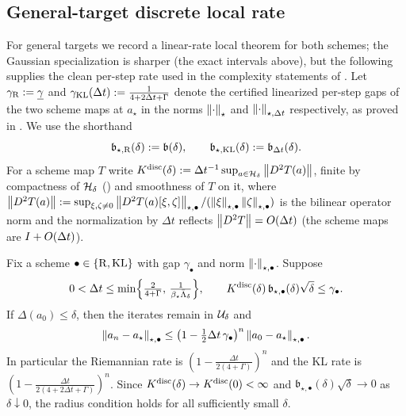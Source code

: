 \subsection{General-target discrete local rate}
\label{subsec:disc-general}

For general targets we record a linear-rate local theorem for both schemes; the Gaussian
specialization is sharper (the exact intervals above), but the following supplies the clean
per-step rate used in the complexity statements of . Let
$\gamma_{\mathrm{R}}:=\underline{\gamma}$ and $\gamma_{\mathrm{KL}}(\Delta t):=\tfrac1{4+2\Delta t+\Gamma}$ denote the
certified linearized per-step gaps of the two scheme maps at $a_\star$ in the norms
$\left\lVert \cdot\right\rVert_\star$ and $\left\lVert \cdot\right\rVert_{\star,\Delta t}$ respectively, as proved in
.  We use the shorthand
\[
    \mathfrak b_{\star,\mathrm{R}}(\delta):=\mathfrak b(\delta),
    \qquad
    \mathfrak b_{\star,\mathrm{KL}}(\delta):=\mathfrak b_{\Delta t}(\delta).
\]
For a scheme map $T$ write
$K^{\mathrm{disc}}(\delta):=\Delta t^{-1}\sup_{a\in\mathcal{H}_\delta}\left\lVert D^2T(a)\right\rVert$, finite by
compactness of $\mathcal{H}_\delta$ () and smoothness of $T$ on it, where
$\left\lVert D^2T(a)\right\rVert:=\sup_{\xi,\zeta\neq0}\left\lVert D^2T(a)[\xi,\zeta]\right\rVert_{\star,\bullet}/(\left\lVert \xi\right\rVert_{\star,\bullet}\left\lVert \zeta\right\rVert_{\star,\bullet})$
is the bilinear operator norm and the normalization by $\Delta t$ reflects
$\left\lVert D^2T\right\rVert=O(\Delta t)$ (the scheme maps are $I+O(\Delta t)$).

\begin{theorem}
\label{thm:disc-local}
Fix a scheme $\bullet\in\{\mathrm{R},\mathrm{KL}\}$ with gap $\gamma_\bullet$ and norm
$\left\lVert \cdot\right\rVert_{\star,\bullet}$. Suppose
\[
    0<\Delta t\leq\min\Bigl\{\tfrac2{4+\Gamma},\,\tfrac1{\beta_\star\bar\Lambda_\delta}\Bigr\},
    \qquad
    K^{\mathrm{disc}}(\delta)\,\mathfrak b_{\star,\bullet}(\delta)\sqrt\delta\leq\gamma_\bullet .
\]
If $\Delta(a_0)\leq\delta$, then the iterates remain in $\mathcal{U}_\delta$ and
\[
    \left\lVert a_n-a_\star\right\rVert_{\star,\bullet}\leq\bigl(1-\tfrac12\Delta t\,\gamma_\bullet\bigr)^n\left\lVert a_0-a_\star\right\rVert_{\star,\bullet}.
\]
In particular the Riemannian rate is $(1-\tfrac{\Delta t}{2(4+\Gamma)})^n$ and the KL rate is
$(1-\tfrac{\Delta t}{2(4+2\Delta t+\Gamma)})^n$. Since $K^{\mathrm{disc}}(\delta)\to K^{\mathrm{disc}}(0)<\infty$ and
$\mathfrak b_{\star,\bullet}(\delta)\sqrt\delta\to0$ as $\delta\downarrow0$, the radius
condition holds for all sufficiently small $\delta$.
\end{theorem}

